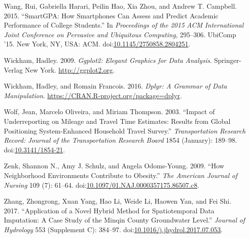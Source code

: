 \documentclass[]{article}
\begin{document}
\hypertarget{ref-wang_smartgpa:_2015}{}
Wang, Rui, Gabriella Harari, Peilin Hao, Xia Zhou, and Andrew T.
Campbell. 2015. ``SmartGPA: How Smartphones Can Assess and Predict
Academic Performance of College Students.'' In \emph{Proceedings of the
2015 ACM International Joint Conference on Pervasive and Ubiquitous
Computing}, 295--306. UbiComp '15. New York, NY, USA: ACM.
doi:\href{https://doi.org/10.1145/2750858.2804251}{10.1145/2750858.2804251}.

\hypertarget{ref-ggplot2}{}
Wickham, Hadley. 2009. \emph{Ggplot2: Elegant Graphics for Data
Analysis}. Springer-Verlag New York. \url{http://ggplot2.org}.

\hypertarget{ref-dplyr}{}
Wickham, Hadley, and Romain Francois. 2016. \emph{Dplyr: A Grammar of
Data Manipulation}. \url{https://CRAN.R-project.org/package=dplyr}.

\hypertarget{ref-wolf_impact_2003}{}
Wolf, Jean, Marcelo Oliveira, and Miriam Thompson. 2003. ``Impact of
Underreporting on Mileage and Travel Time Estimates: Results from Global
Positioning System-Enhanced Household Travel Survey.''
\emph{Transportation Research Record: Journal of the Transportation
Research Board} 1854 (January): 189--98.
doi:\href{https://doi.org/10.3141/1854-21}{10.3141/1854-21}.

\hypertarget{ref-zenk_how_2009}{}
Zenk, Shannon N., Amy J. Schulz, and Angela Odoms-Young. 2009. ``How
Neighborhood Environments Contribute to Obesity.'' \emph{The American
Journal of Nursing} 109 (7): 61--64.
doi:\href{https://doi.org/10.1097/01.NAJ.0000357175.86507.c8}{10.1097/01.NAJ.0000357175.86507.c8}.

\hypertarget{ref-zhang_application_2017}{}
Zhang, Zhongrong, Xuan Yang, Hao Li, Weide Li, Haowen Yan, and Fei Shi.
2017. ``Application of a Novel Hybrid Method for Spatiotemporal Data
Imputation: A Case Study of the Minqin County Groundwater Level.''
\emph{Journal of Hydrology} 553 (Supplement C): 384--97.
doi:\href{https://doi.org/10.1016/j.jhydrol.2017.07.053}{10.1016/j.jhydrol.2017.07.053}.
\end{document}
